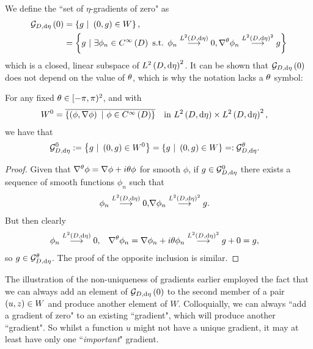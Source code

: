 We define the ``set of $\eta$-gradients of zero" as
\begin{align} \label{eq:GradZeroDef}
	\mathcal{G}_{ D, \mathrm{d}\eta}\left( 0 \right) &= \left\{  g \ \vert \ \left( 0,g \right)\in W \right\}, \\
	&= \left\{  g \ \vert \ \exists\phi_n\in C^{\infty}\left( D \right) \text{ s.t. } \phi_n\overset{L^{2}\left( D,\mathrm{d}\eta \right)}{\longrightarrow}0, \nabla^{\theta}\phi_n\overset{L^{2}\left( D,\mathrm{d}\eta \right)^2}{\longrightarrow}g  \right\}
\end{align}
which is a closed, linear subspace of $L^{2}\left( D,\mathrm{d}\eta \right)^2$. 
It can be shown that $\mathcal{G}_{ D, \mathrm{d}\eta}\left( 0 \right)$ does not depend on the value of $\theta$, which is why the notation lacks a $\theta$ symbol:
\begin{prop} \label{prop:GradZeroInvarientUnderQM}
	For any fixed $\theta\in[-\pi,\pi)^2$, and with
	\begin{align*}
		W^0 &= \overline{\clbracs{\bracs{\phi,\grad\phi} \ \vert \ \phi\in\smooth{D}}} \quad \text{in} \ \ltwo{D}{\eta}\times\ltwo{D}{\eta}^2,
	\end{align*}	
	we have that
	\begin{align*}
		\mathcal{G}^0_{D, \md \eta} := \clbracs{ g \ \vert \ \bracs{0,g}\in W^0} &= 
		\clbracs{ g \ \vert \ \bracs{0,g}\in W} =: \mathcal{G}^{\qm}_{D, \md \eta}.
	\end{align*}
\end{prop}
\begin{proof}
	Given that $\nabla^{\theta}\phi = \nabla\phi + i\theta\phi$ for smooth $\phi$, if $g\in\mathcal{G}^0_{D, \mathrm{d} \eta}$ there exists a sequence of smooth functions $\phi_n$ such that 
	\begin{align*}
		\phi_n\overset{L^{2}\left( D,\mathrm{d}\eta \right)}{\longrightarrow}0, &\nabla\phi_n\overset{L^{2}\left( D,\mathrm{d}\eta \right)^2}{\longrightarrow}g.
	\end{align*}
	But then clearly
	\begin{align*}
		\phi_n\overset{L^{2}\left( D,\mathrm{d}\eta \right)}{\longrightarrow}0, &\quad
		\nabla^{\theta}\phi_n = \nabla\phi_n + i\theta\phi_n \overset{L^{2}\left( D,\mathrm{d}\eta \right)^2}{\longrightarrow} g + 0 = g,
	\end{align*}
	so $g\in\mathcal{G}^\theta_{D, \mathrm{d} \eta}$.
	The proof of the opposite inclusion is similar.
\end{proof}
The illustration of the non-uniqueness of gradients earlier employed the fact that we can always add an element of $\mathcal{G}_{ D, \mathrm{d}\eta}\left( 0 \right)$ to the second member of a pair $\left( u,z \right)\in W$ and produce another element of $W$.
Colloquially, we can always ``add a gradient of zero" to an existing ``gradient", which will produce another ``gradient".
So whilst a function $u$ might not have a unique gradient, it may at least have only one ``\emph{important}" gradient. \newline

